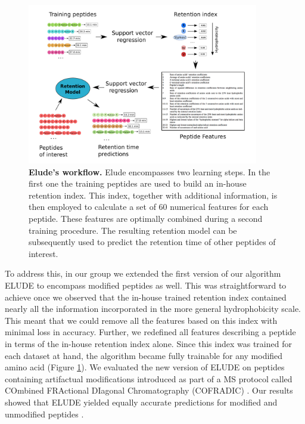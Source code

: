 \documentclass[a4paper]{article}
\begin{document}
\begin{figure}[!h]
\centering 
\includegraphics[width=0.9\textwidth]{img/elude-ptm.pdf}
\caption{\label{fig:elude} {\bf {\sc Elude}'s workflow.}  {\sc Elude} encompasses two learning steps. In the first one the training peptides are used to build an in-house retention index. This index, together with additional information, is then employed to calculate a set of 60 numerical features for each peptide. These features are optimally combined during a second training procedure. The resulting retention model can be subsequently used to predict the retention time of other peptides of interest.}
\end{figure}

\vspace{0.15cm}

To address this, in our group we extended the first version of our algorithm {\sc ELUDE} to encompass modified peptides as well. This was straightforward to achieve once we observed that the in-house trained  retention index contained nearly all the information incorporated in the more general hydrophobicity scale. This meant that we could remove all the features based on this index with minimal loss in accuracy. Further, we redefined all features describing a peptide in terms of the in-house retention index alone. Since this index was trained for each dataset at hand, the algorithm became fully trainable for any modified amino acid (Figure \ref{fig:elude}). We evaluated the new version of {\sc ELUDE} on peptides containing artifactual modifications introduced as part of a MS protocol called COmbined
FRActional DIagonal Chromatography (COFRADIC) \cite{Gevaert2002}. Our results showed that  {\sc ELUDE} yielded equally accurate predictions for modified and
unmodified peptides  \cite{elude2}.
\end{document}

